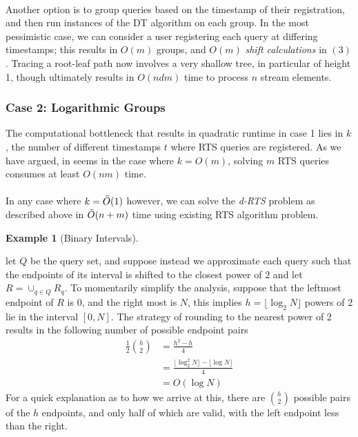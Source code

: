 \documentclass{article}
\newtheorem{example}{Example}
\begin{document}
\\
Another option is to group queries based on the timestamp of their registration, and then run instances of the DT algorithm on each group. In the most pessimistic case, we can consider a user registering each query at differing timestamps; this results in $O(m)$ groups, and $O(m)$ \textit{shift calculations} in $(3)$. Tracing a root-leaf path now involves a very shallow tree, in particular of height 1, though ultimately results in $O(ndm)$ time to process $n$ stream elements.

\subsubsection*{Case 2: Logarithmic Groups}
The computational bottleneck that results in quadratic runtime in case 1 lies in $k$, the number of different timestamps $t$ where RTS queries are registered. As we have argued, in seems in the case where $k = O(m)$, solving $m$ RTS queries consumes at least $O(nm)$ time. \\
\\
In any case where $k = \Tilde{O}(1)$ however, we can solve the \textit{d-RTS} problem as described above in $\Tilde{O}(n+m)$ time using existing RTS algorithm problem.


\begin{example}[Binary Intervals] 
\end{example}
let $Q$ be the query set, and suppose instead we approximate each query such that the endpoints of its interval is shifted to the closest power of $2$ and let $R = \cup_{q\in Q}R_q$. To momentarily simplify the analysis, suppose that the leftmost endpoint of $R$ is 0, and the right most is $N$, this implies $h = \lfloor \log_2 N \rfloor$ powers of 2 lie in the interval $[0,N]$. The strategy of rounding to the nearest power of 2 results in the following number of possible endpoint pairs
\begin{align*}
    \frac{1}{2} {h\choose 2} &= \frac{h^2-h}{4} \\
    &= \frac{\lfloor\log^2_2 N\rfloor - \lfloor\log N\rfloor}{4} \\
    &= O(\log N)
\end{align*}
For a quick explanation as to how we arrive at this, there are ${h\choose2}$ possible pairs of the $h$ endpoints, and only half of which are valid, with the left endpoint less than the right.
\end{document}
